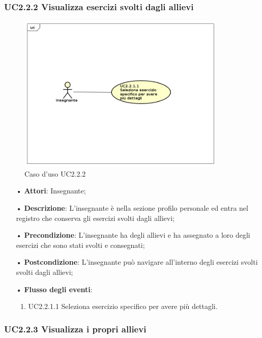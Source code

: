 \subsubsection{UC2.2.2  Visualizza esercizi svolti dagli allievi}
\begin{figure}[H]
\centering
\includegraphics[width=10cm]{img/UC222.png} 
\caption{Caso d'uso UC2.2.2}
\end{figure}
\begin{itemize}
	\item[•] \textbf{Attori}: Insegnante;
	\item[•] \textbf{Descrizione}:  L’insegnante è nella sezione profilo personale ed entra
		nel registro che conserva gli esercizi svolti dagli allievi;
	\item[•] \textbf{Precondizione}:  L’insegnante ha degli allievi e ha assegnato a loro degli esercizi che sono stati svolti e consegnati;

	\item[•] \textbf{Postcondizione}: L’insegnante può navigare all’interno degli esercizi svolti 
                       svolti dagli allievi; 

	\item[•] \textbf{Flusso degli eventi}:
		\begin{enumerate}
			\item UC2.2.1.1  Seleziona esercizio specifico per avere più dettagli.	
		\end{enumerate}
\end{itemize}

\subsubsection{UC2.2.3 Visualizza i propri allievi}


